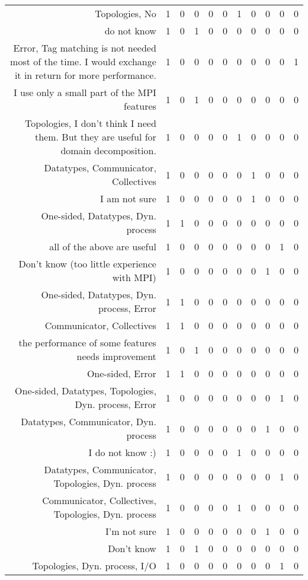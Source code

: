 {\begin{landscape}
\begin{longtable}[htb]{r|c|c|c|c|c|c|c|c|c|c}
{Topologies, No} & 1 & 0 & 0 & 0 & 0 & 1 & 0 & 0 & 0 & 0 \\%
{do not know} & 1 & 0 & 1 & 0 & 0 & 0 & 0 & 0 & 0 & 0 \\%
{Error, Tag matching is not needed most of the time. I would exchange it in return for more performance.} & 1 & 0 & 0 & 0 & 0 & 0 & 0 & 0 & 0 & 1 \\%
{I use only a small part of the MPI features} & 1 & 0 & 1 & 0 & 0 & 0 & 0 & 0 & 0 & 0 \\%
{Topologies, I don't think I need them. But they are useful for domain decomposition.} & 1 & 0 & 0 & 0 & 0 & 1 & 0 & 0 & 0 & 0 \\%
{Datatypes, Communicator, Collectives} & 1 & 0 & 0 & 0 & 0 & 0 & 1 & 0 & 0 & 0 \\%
{I am not sure} & 1 & 0 & 0 & 0 & 0 & 0 & 1 & 0 & 0 & 0 \\%
{One-sided, Datatypes, Dyn. process} & 1 & 1 & 0 & 0 & 0 & 0 & 0 & 0 & 0 & 0 \\%
{all of the above are useful} & 1 & 0 & 0 & 0 & 0 & 0 & 0 & 0 & 1 & 0 \\%
{Don't know (too little experience with MPI)} & 1 & 0 & 0 & 0 & 0 & 0 & 0 & 1 & 0 & 0 \\%
{One-sided, Datatypes, Dyn. process, Error} & 1 & 1 & 0 & 0 & 0 & 0 & 0 & 0 & 0 & 0 \\%
{Communicator, Collectives} & 1 & 1 & 0 & 0 & 0 & 0 & 0 & 0 & 0 & 0 \\%
{the performance of some features needs improvement} & 1 & 0 & 1 & 0 & 0 & 0 & 0 & 0 & 0 & 0 \\%
{One-sided, Error} & 1 & 1 & 0 & 0 & 0 & 0 & 0 & 0 & 0 & 0 \\%
{One-sided, Datatypes, Topologies, Dyn. process, Error} & 1 & 0 & 0 & 0 & 0 & 0 & 0 & 0 & 1 & 0 \\%
{Datatypes, Communicator, Dyn. process} & 1 & 0 & 0 & 0 & 0 & 0 & 0 & 1 & 0 & 0 \\%
{I do not know :)} & 1 & 0 & 0 & 0 & 0 & 1 & 0 & 0 & 0 & 0 \\%
{Datatypes, Communicator, Topologies, Dyn. process} & 1 & 0 & 0 & 0 & 0 & 0 & 0 & 0 & 1 & 0 \\%
{Communicator, Collectives, Topologies, Dyn. process} & 1 & 0 & 0 & 0 & 0 & 1 & 0 & 0 & 0 & 0 \\%
{I'm not sure} & 1 & 0 & 0 & 0 & 0 & 0 & 0 & 1 & 0 & 0 \\%
{Don't know} & 1 & 0 & 1 & 0 & 0 & 0 & 0 & 0 & 0 & 0 \\%
{Topologies, Dyn. process, I/O} & 1 & 0 & 0 & 0 & 0 & 0 & 0 & 0 & 1 & 0 \\%

\end{longtable}
\end{landscape}}
